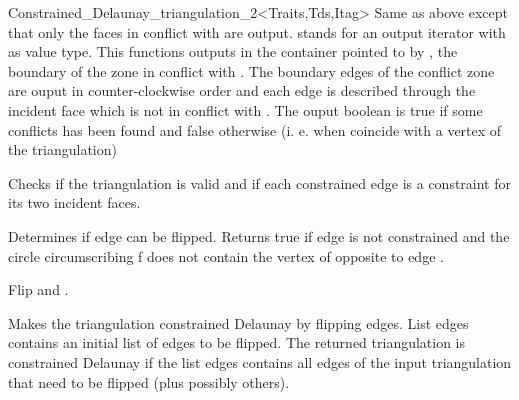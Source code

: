 \begin{ccRefClass}{Constrained_Delaunay_triangulation_2<Traits,Tds,Itag>}
{Same as above except that only the faces in conflict with 
are output.}
{  stands for an output iterator with  as value
type.
 This functions  outputs in the container pointed to by ,
the boundary of the zone in conflict with . The boundary edges
of the conflict  zone are ouput in counter-clockwise order
and each edge is described  through the incident face
which is not in conflict with .
The ouput boolean is true if some conflicts has been found and false
otherwise
(i. e. when  coincide with a vertex of the triangulation)}



{ Checks if the triangulation is valid and if each constrained edge is
a constraint for its two incident faces.}

\begin{ccAdvanced}

{ Determines if edge  can be flipped. Returns true if
edge  is not constrained and  the circle circumscribing f
does not contain the vertex of 
opposite to edge . }

{ Flip  and .}


{ Makes the triangulation constrained Delaunay by flipping edges. 
List edges contains an
initial list of edges to be flipped. The returned
triangulation is constrained Delaunay 
if the list edges contains all edges of the
input triangulation that need to be flipped (plus possibly others). }
\end{ccAdvanced}


\ccSeeAlso
{} \\
 \\
 \\
 \\
 \\





\end{ccRefClass}


